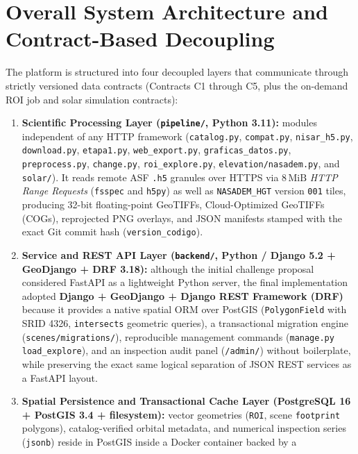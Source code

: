 \documentclass[11pt,a4paper]{article}
\newcommand{\src}[1]{\nolinkurl{#1}}
\newcommand{\unit}[1]{\mathrm{#1}}
\begin{document}
\section{Overall System Architecture and Contract-Based Decoupling}
\label{sec:arq-general}

The platform is structured into four decoupled layers that communicate through strictly versioned data contracts
(Contracts C1 through C5, plus the on-demand ROI job and solar simulation contracts):

\begin{enumerate}
  \item \textbf{Scientific Processing Layer (\src{pipeline/}, Python 3.11):}
        modules independent of any HTTP framework (\src{catalog.py}, \src{compat.py}, \src{nisar\_h5.py},
        \src{download.py}, \src{etapa1.py}, \src{web\_export.py}, \src{graficas\_datos.py}, \src{preprocess.py},
        \src{change.py}, \src{roi\_explore.py}, \src{elevation/nasadem.py}, and \src{solar/}). It reads remote
        ASF \texttt{.h5} granules over HTTPS via $8\,\unit{MiB}$ \emph{HTTP Range Requests} (\texttt{fsspec} and
        \texttt{h5py}) as well as \texttt{NASADEM\_HGT} version \texttt{001} tiles, producing 32-bit floating-point
        GeoTIFFs, Cloud-Optimized GeoTIFFs (COGs), reprojected PNG overlays, and JSON manifests stamped with the
        exact Git commit hash (\texttt{version\_codigo}).
  \item \textbf{Service and REST API Layer (\src{backend/}, Python / Django 5.2 + GeoDjango + DRF 3.18):}
        although the initial challenge proposal considered FastAPI as a lightweight Python server, the final
        implementation adopted \textbf{Django + GeoDjango + Django REST Framework (DRF)} because it provides a
        native spatial ORM over PostGIS (\texttt{PolygonField} with SRID 4326, \texttt{intersects} geometric
        queries), a transactional migration engine (\src{scenes/migrations/}), reproducible management commands
        (\texttt{manage.py load\_explore}), and an inspection audit panel (\texttt{/admin/}) without boilerplate,
        while preserving the exact same logical separation of JSON REST services as a FastAPI layout.
  \item \textbf{Spatial Persistence and Transactional Cache Layer (PostgreSQL 16 + PostGIS 3.4 + filesystem):}
        vector geometries (\texttt{ROI}, scene \texttt{footprint} polygons), catalog-verified orbital metadata,
        and numerical inspection series (\texttt{jsonb}) reside in PostGIS inside a Docker container backed by a

\end{enumerate}
\end{document}

